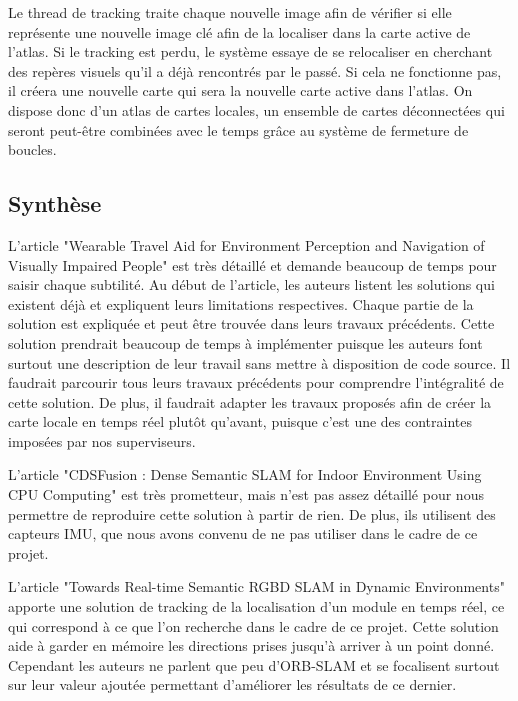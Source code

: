 \documentclass[11pt]{article}
\begin{document}
          Le thread de tracking traite chaque nouvelle image afin de vérifier si elle représente une nouvelle image clé afin de la localiser
          dans la carte active de l'atlas. Si le tracking est perdu, le système essaye de se relocaliser en cherchant des repères visuels 
          qu'il a déjà rencontrés par le passé. Si cela ne fonctionne pas, il créera une nouvelle carte qui sera la nouvelle carte active dans l'atlas.
          On dispose donc d'un atlas de cartes locales, un ensemble de cartes déconnectées qui seront peut-être combinées avec le temps grâce au 
          système de fermeture de boucles.

        \clearpage

    \subsection{Synthèse}
      L'article "Wearable Travel Aid for Environment Perception and Navigation of Visually Impaired People" est très détaillé et demande beaucoup 
      de temps pour saisir chaque subtilité.
      Au début de l'article, les auteurs listent les solutions qui existent déjà et expliquent leurs limitations respectives. 
      Chaque partie de la solution est expliquée et peut être trouvée dans leurs travaux précédents. Cette solution prendrait beaucoup de temps
      à implémenter puisque les auteurs font surtout une description de leur travail sans mettre à disposition de code source. 
      Il faudrait parcourir tous leurs travaux précédents pour comprendre l'intégralité de cette solution. De plus, il faudrait adapter les travaux
      proposés afin de créer la carte locale en temps réel plutôt qu'avant, puisque c'est une des contraintes imposées par nos superviseurs. 

      L'article "CDSFusion : Dense Semantic SLAM for Indoor Environment Using CPU Computing" est très prometteur, mais n'est pas assez détaillé 
      pour nous permettre de reproduire cette solution à partir de rien. De plus, ils utilisent des capteurs IMU, que nous avons convenu de ne pas 
      utiliser dans le cadre de ce projet.

      L'article "Towards Real-time Semantic RGBD SLAM in Dynamic Environments" apporte une solution de tracking de la localisation 
      d'un module en temps réel, ce qui correspond à ce que l'on recherche dans le cadre de ce projet. Cette solution aide à garder en 
      mémoire les directions prises jusqu'à arriver à un point donné. Cependant les auteurs ne parlent que peu d'ORB-SLAM et se focalisent 
      surtout sur leur valeur ajoutée permettant d'améliorer les résultats de ce dernier.
\end{document}
